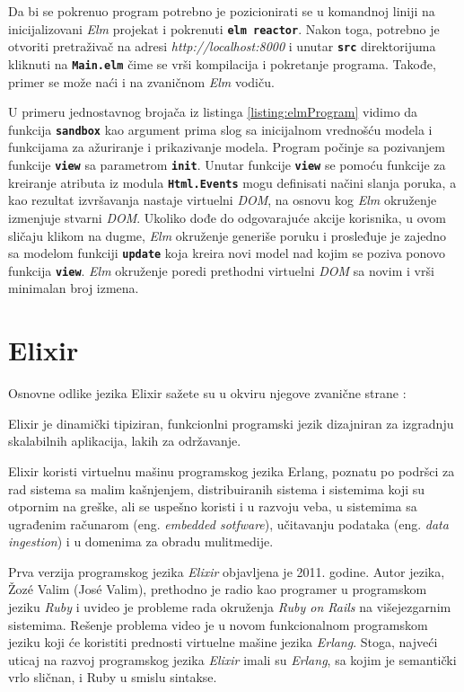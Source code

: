 \documentclass[12pt,oneside]{memoir}
\begin{document}
Da bi se pokrenuo program potrebno je pozicionirati se u komandnoj liniji na inicijalizovani
\emph{Elm} projekat i pokrenuti \texttt{\textbf{elm reactor}}. Nakon toga, potrebno je otvoriti pretraživač na
adresi \emph{http://localhost:8000} i unutar \texttt{\textbf{src}} direktorijuma kliknuti na 
\texttt{\textbf{Main.elm}} čime se vrši kompilacija i pokretanje programa. Takođe, primer se
može naći i na zvaničnom \emph{Elm} vodiču\cite{elm-program}.

U primeru jednostavnog brojača iz listinga \ref{listing:elmProgram} vidimo da funkcija
\textbf{\texttt{sandbox}} kao argument prima slog sa inicijalnom vrednošću modela i 
funkcijama za ažuriranje i prikazivanje modela. Program počinje sa pozivanjem funkcije
\texttt{\textbf{view}} sa parametrom \texttt{\textbf{init}}. Unutar funkcije
\texttt{\textbf{view}} se pomoću funkcije za kreiranje atributa iz modula
\texttt{\textbf{Html.Events}} mogu definisati načini slanja poruka, a kao rezultat 
izvršavanja nastaje virtuelni \emph{DOM}, na osnovu kog \emph{Elm} okruženje izmenjuje stvarni \emph{DOM}.
Ukoliko dođe do odgovarajuće akcije korisnika, u ovom sličaju klikom na dugme, \emph{Elm} okruženje
generiše poruku i prosleđuje je zajedno sa modelom funkciji \texttt{\textbf{update}} koja
kreira novi model nad kojim se poziva ponovo funkcija \texttt{\textbf{view}}.
\emph{Elm} okruženje poredi prethodni virtuelni \emph{DOM} sa novim i vrši minimalan broj izmena.  

\chapter{Elixir}
Osnovne odlike jezika Elixir sažete su u okviru njegove zvanične strane \cite{elixir}:
\begin{displayquote}
Elixir je dinamički tipiziran, funkcionlni programski jezik dizajniran za izgradnju skalabilnih
aplikacija, lakih za održavanje.

Elixir koristi virtuelnu mašinu programskog jezika Erlang, poznatu po podršci za rad sistema sa malim kašnjenjem,
distribuiranih sistema i sistemima koji su otpornim na greške, ali se uspešno koristi i u razvoju
veba, u sistemima sa ugrađenim računarom (eng. \emph{embedded sotfware}), učitavanju podataka
(eng. \emph{data ingestion}) i u domenima za obradu mulitmedije.
\end{displayquote}

Prva verzija programskog jezika \emph{Elixir} objavljena je 2011. godine. Autor jezika, Žozé Valim
(José Valim), prethodno je radio kao programer u programskom jeziku \emph{Ruby} i uvideo je probleme rada
okruženja \emph{Ruby on Rails} na višejezgarnim sistemima. Rešenje problema video je u novom funkcionalnom
programskom jeziku koji će koristiti prednosti virtuelne mašine jezika \emph{Erlang}. Stoga, najveći
uticaj na razvoj programskog jezika \emph{Elixir} imali su \emph{Erlang}, sa kojim je semantički vrlo sličnan,
i Ruby u smislu sintakse. 
\end{document}
